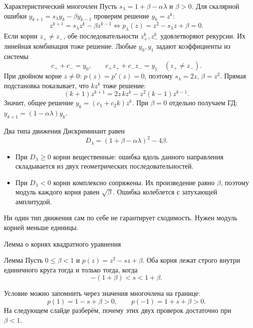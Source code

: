 \documentclass[aspectratio=169,10pt]{beamer}
\begin{document}
\begin{frame}{Характеристический многочлен}
\scriptsize
Пусть $s_\lambda=1+\beta-\alpha\lambda$ и $\beta>0$. Для скалярной ошибки $y_{k+1}=s_\lambda y_k-\beta y_{k-1}$ проверим решение $y_k=z^k$:
\[
z^{k+1}=s_\lambda z^k-\beta z^{k-1}
\iff \boxed{p_\lambda(z)=z^2-s_\lambda z+\beta=0.}
\]
Если корни $z_+\ne z_-$, обе последовательности $z_+^k,z_-^k$ удовлетворяют рекурсии. Их линейная комбинация тоже решение. Любые $y_0,y_1$ задают коэффициенты из системы
\[
c_++c_-=y_0,\qquad c_+z_++c_-z_-=y_1
\quad(z_+\ne z_-).
\]
При двойном корне $z\ne0$: $p(z)=p'(z)=0$, поэтому $s_\lambda=2z$, $\beta=z^2$. Прямая подстановка показывает, что $kz^k$ тоже решение:
\[(k+1)z^{k+1}=2z\,kz^k-z^2(k-1)z^{k-1}.\]
Значит, общее решение $y_k=(c_1+c_2k)z^k$. При $\beta=0$ отдельно получаем ГД: $y_{k+1}=(1-\alpha\lambda)y_k$.
\end{frame}

\begin{frame}{Два типа движения}
\small
Дискриминант равен
\[
D_\lambda=(1+\beta-\alpha\lambda)^2-4\beta.
\]
\begin{itemize}
\item При $D_\lambda\ge0$ корни вещественные: ошибка вдоль данного направления складывается из двух геометрических последовательностей.
\item При $D_\lambda<0$ корни комплексно сопряжены. Их произведение равно $\beta$, поэтому модуль каждого корня равен $\sqrt{\beta}$. Ошибка колеблется с затухающей амплитудой.
\end{itemize}
Ни один тип движения сам по себе не гарантирует сходимость. Нужен модуль корней меньше единицы.
\end{frame}

\begin{frame}{Лемма о корнях квадратного уравнения}
\small
\begin{block}{Лемма}
Пусть $0\le\beta<1$ и $p(z)=z^2-sz+\beta$. Оба корня лежат строго внутри единичного круга тогда и только тогда, когда
\[
-(1+\beta)<s<1+\beta .
\]
\end{block}
Условие можно запомнить через значения многочлена на границе:
\[
p(1)=1-s+\beta>0,\qquad
p(-1)=1+s+\beta>0.
\]
На следующем слайде разберём, почему этих двух проверок достаточно при $\beta<1$.
\end{frame}
\end{document}
